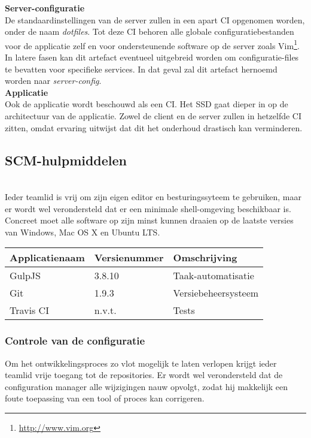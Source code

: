 \textbf{Server-configuratie} \\

De standaardinstellingen van de server zullen in een apart CI opgenomen worden, onder de naam \textit{dotfiles}. Tot deze CI behoren alle globale configuratiebestanden voor de applicatie zelf en voor ondersteunende software op de server zoals Vim\footnote{\url{http://www.vim.org}}. In latere fasen kan dit artefact eventueel uitgebreid worden om configuratie-files te bevatten voor specifieke services. In dat geval zal dit artefact hernoemd worden naar \textit{server-config}. \\

\textbf{Applicatie} \\

Ook de applicatie wordt beschouwd als een CI. Het SSD gaat dieper in op de architectuur van de applicatie. Zowel de client en de server zullen in hetzelfde CI zitten, omdat ervaring uitwijst dat dit het onderhoud drastisch kan verminderen. \\

\subsection{SCM-hulpmiddelen} \\

Ieder teamlid is vrij om zijn eigen editor en besturingssyteem te gebruiken, maar er wordt wel verondersteld dat er een minimale shell-omgeving beschikbaar is. Concreet moet alle software op zijn minst kunnen draaien op de laatste versies van Windows, Mac OS X en Ubuntu LTS. \\

\begin{tabular}{l|l|l}
Applicatienaam & Versienummer & Omschrijving \\
\hline
GulpJS & 3.8.10 & Taak-automatisatie  \\
Git & 1.9.3 & Versiebeheersysteem \\
Travis CI & n.v.t. & Tests \\
\end{tabular}

\subsubsection{Controle van de configuratie}

Om het ontwikkelingsproces zo vlot mogelijk te laten verlopen krijgt ieder teamlid vrije toegang tot de repositories. Er wordt wel verondersteld dat de configuration manager alle wijzigingen nauw opvolgt, zodat hij makkelijk een foute toepassing van een tool of proces kan corrigeren. \\

